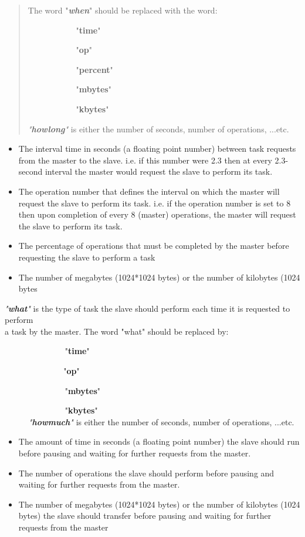 \begin{quote}
The word "\emph{\textbf{when}}" should be replaced with the word:\\
\strut ~~~~~~~~~~~ "\textbf{time}"\\
\strut ~~~~~~~~~~~ "\textbf{op}"\\
\strut ~~~~~~~~~~~ "\textbf{percent}"\\
\strut ~~~~~~~~~~~ "\textbf{mbytes}"\\
\strut ~~~~~~~~~~~ "\textbf{kbytes}"

\emph{"\textbf{howlong}"} is either the number of seconds, number of operations, ...etc.
\end{quote}

\begin{itemize}
\item
  The interval time in seconds (a floating point number) between task requests from the master to the slave. i.e. if this number were 2.3 then at every 2.3-second interval the master would request the slave to perform its task.
\item
  The operation number that defines the interval on which the master will request the slave to perform its task. i.e. if the operation number is set to 8 then upon completion of every 8 (master) operations, the master will request the slave to perform its task.
\item
  The percentage of operations that must be completed by the master before requesting the slave to perform a task
\item
  The number of megabytes (1024*1024 bytes) or the number of kilobytes (1024 bytes
\end{itemize}

\emph{"\textbf{what}"} is the type of task the slave should perform each time it is requested to perform\\
a task by the master. The word "what" should be replaced by:\\
\strut ~~~~~~~~~~~~~~ "\textbf{time}"\\
\strut ~~~~~~~~~~~~ ~ "\textbf{op}"\\
\strut ~~~~~~~~~~~~~~ "\textbf{mbytes}"\\
\strut ~~~~~~~~~~~~~~ "\textbf{kbytes}"\\
\emph{~~~~~ "\textbf{howmuch}"} is either the number of seconds, number of operations, ...etc.

\begin{itemize}
\item
  The amount of time in seconds (a floating point number) the slave should run before pausing and waiting for further requests from the master.
\item
  The number of operations the slave should perform before pausing and waiting for further requests from the master.
\item
  The number of megabytes (1024*1024 bytes) or the number of kilobytes (1024 bytes) the slave should transfer before pausing and waiting for further requests from the master
\end{itemize}

